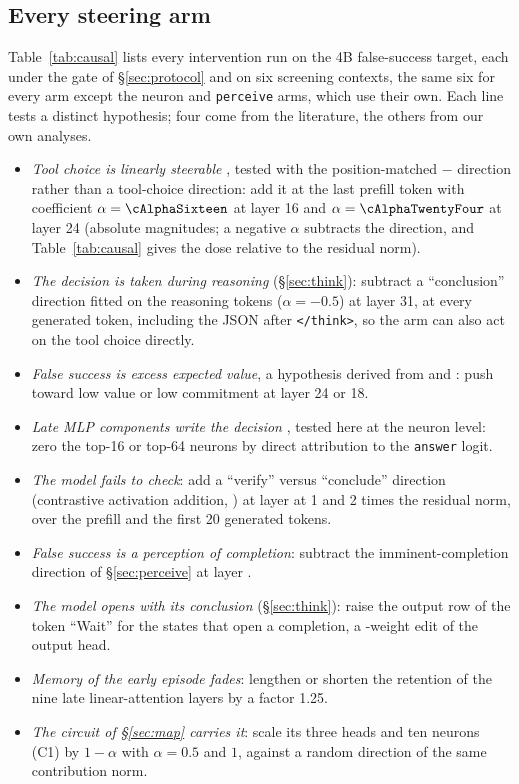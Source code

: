 \subsection{Every steering arm}\label{sec:every-arm}
Table~\ref{tab:causal} lists every intervention run on the 4B false-success target, each under the gate of \S\ref{sec:protocol} and on six screening contexts, the same six for every arm except the neuron and \texttt{perceive} arms, which use their own. Each line tests a distinct hypothesis; four come from the literature, the others from our own analyses.
\begin{itemize}
\item \emph{Tool choice is linearly steerable} \citep{wu2026toolcalling}, tested with the position-matched \fsp{}$-$\fsm{} direction rather than a tool-choice direction: add it at the last prefill token with coefficient $\alpha=\cAlphaSixteen$ at layer 16 and $\alpha=\cAlphaTwentyFour$ at layer 24 (absolute magnitudes; a negative $\alpha$ subtracts the direction, and Table~\ref{tab:causal} gives the dose relative to the residual norm).
\item \emph{The decision is taken during reasoning} (\S\ref{sec:think}): subtract a ``conclusion'' direction fitted on the reasoning tokens ($\alpha=-0.5$) at layer 31, at every generated token, including the JSON after \texttt{</think>}, so the arm can also act on the tool choice directly. %
\item \emph{False success is excess expected value}, a hypothesis derived from \citet{jiang2026value} and \citet{kumaran2026commit}: push toward low value or low commitment at layer 24 or 18.
\item \emph{Late MLP components write the decision} \citep{dutta2026termination}, tested here at the neuron level: zero the top-16 or top-64 neurons by direct attribution to the \texttt{answer} logit.
\item \emph{The model fails to check}: add a ``verify'' versus ``conclude'' direction (contrastive activation addition, \citealp{rimsky2023caa}) at layer \verifyLayer{} at 1 and 2 times the residual norm, over the prefill and the first 20 generated tokens.
\item \emph{False success is a perception of completion}: subtract the imminent-completion direction of \S\ref{sec:perceive} at layer \pcLayer.
\item \emph{The model opens with its conclusion} (\S\ref{sec:think}): raise the output row of the token ``Wait'' for the states that open a completion, a \waitWeights-weight edit of the output head.
\item \emph{Memory of the early episode fades}: lengthen or shorten the retention of the nine late linear-attention layers by a factor 1.25.
\item \emph{The circuit of \S\ref{sec:map} carries it}: scale its three heads and ten neurons (C1) by $1-\alpha$ with $\alpha=0.5$ and $1$, against a random direction of the same contribution norm.
\end{itemize}
